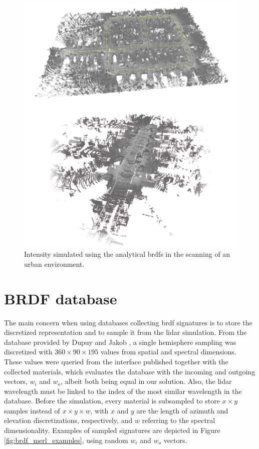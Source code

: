 \begin{figure}[ht]
    \centering
    \includegraphics[width=\linewidth]{figs/lidar_intensity/analytical_brdf_intensity_result.png}
    \caption{Intensity simulated using the analytical \acrshort{brdf}s in the scanning of an urban environment. }
	\label{fig:lidar_analytical_brdfs_intensity_result}
\end{figure}

\section{BRDF database}

The main concern when using databases collecting \acrshort{brdf} signatures is to store the discretized representation and to sample it from the \acrshort{lidar} simulation. From the database provided by Dupuy and Jakob \cite{dupuy_adaptive_2018}, a single hemisphere sampling was discretized with $360 \times 90 \times 195$ values from spatial and spectral dimensions. These values were queried from the interface published together with the collected materials, which evaluates the database with the incoming and outgoing vectors, $w_i$ and $w_o$, albeit both being equal in our solution. Also, the \acrshort{lidar} wavelength must be linked to the index of the most similar wavelength in the database. Before the simulation, every material is subsampled to store $x \times y$ samples instead of $x \times y \times w$, with $x$ and $y$ are the length of azimuth and elevation discretizations, respectively, and $w$ referring to the spectral dimensionality. Examples of sampled signatures are depicted in Figure \ref{fig:brdf_merl_examples}, using random $w_i$ and $w_o$ vectors.

